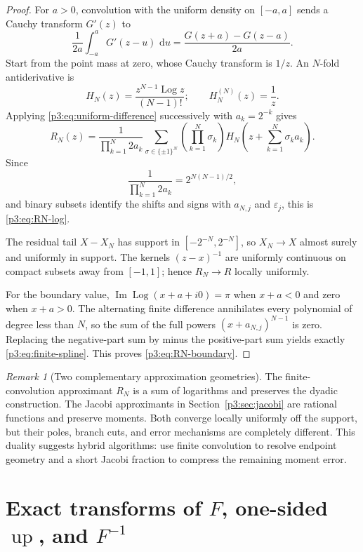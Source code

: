 \documentclass[11pt]{article}
\theoremstyle{definition}
\theoremstyle{remark}
\newtheorem{remark}[theorem]{Remark}
\newcommand{\dd}{\,\mathrm d}
\newcommand{\Up}{\operatorname{up}}
\newcommand{\eps}{\varepsilon}
\newcommand{\Log}{\operatorname{Log}}
\begin{document}
\begin{proof}
For \(a>0\), convolution with the uniform density on \([-a,a]\) sends a Cauchy transform
\(G'(z)\) to
\begin{equation}
 \frac1{2a}\int_{-a}^{a}G'(z-u)\,\dd u
 =\frac{G(z+a)-G(z-a)}{2a}.                                  \label{p3:eq:uniform-difference}
\end{equation}
Start from the point mass at zero, whose Cauchy transform is \(1/z\).  An \(N\)-fold
antiderivative is
\[
 H_N(z)=\frac{z^{N-1}\Log z}{(N-1)!};
 \qquad H_N^{(N)}(z)=\frac1z.
\]
Applying \eqref{p3:eq:uniform-difference} successively with \(a_k=2^{-k}\) gives
\[
 R_N(z)=\frac{1}{\prod_{k=1}^{N}2a_k}
 \sum_{\sigma\in\{\pm1\}^N}
 \left(\prod_{k=1}^{N}\sigma_k\right)
 H_N\!\left(z+\sum_{k=1}^{N}\sigma_k a_k\right).
\]
Since
\[
 \frac1{\prod_{k=1}^{N}2a_k}=2^{N(N-1)/2},
\]
and binary subsets identify the shifts and signs with \(a_{N,j}\) and \(\eps_j\), this is
\eqref{p3:eq:RN-log}.

The residual tail \(X-X_N\) has support in \([-2^{-N},2^{-N}]\), so \(X_N\to X\)
almost surely and uniformly in support.  The kernels \((z-x)^{-1}\) are uniformly
continuous on compact subsets away from \([-1,1]\); hence \(R_N\to R\) locally uniformly.

For the boundary value, \(\operatorname{Im}\Log(x+a+i0)=\pi\) when \(x+a<0\) and zero
when \(x+a>0\).  The alternating finite difference annihilates every polynomial of degree
less than \(N\), so the sum of the full powers \((x+a_{N,j})^{N-1}\) is zero.  Replacing the
negative-part sum by minus the positive-part sum yields exactly
\eqref{p3:eq:finite-spline}.  This proves \eqref{p3:eq:RN-boundary}.
\end{proof}

\begin{remark}[Two complementary approximation geometries]
The finite-convolution approximant \(R_N\) is a sum of logarithms and preserves the dyadic
construction.  The Jacobi approximants in Section~\ref{p3:sec:jacobi} are rational functions
and preserve moments.  Both converge locally uniformly off the support, but their poles,
branch cuts, and error mechanisms are completely different.  This duality suggests hybrid
algorithms: use finite convolution to resolve endpoint geometry and a short Jacobi fraction
to compress the remaining moment error.
\end{remark}

\section{Exact transforms of \(F\), one-sided \(\Up\), and \(F^{-1}\)}\label{p3:sec:fabius-transforms}
\end{document}
